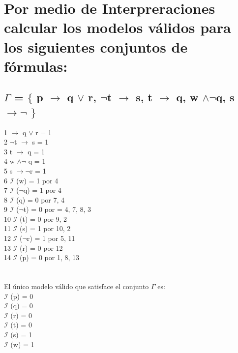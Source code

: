 \documentclass[11pt,letterpaper]{article}
\begin{document}
  \section{Por medio de Interpreraciones calcular los modelos válidos para los siguientes conjuntos de fórmulas:}
    \subsection{$\Gamma$ = $\{$ p $\rightarrow$ q $\vee$ r, $\neg$t $\rightarrow$ s, t $\rightarrow$ q, w $\wedge \neg$q, s $\rightarrow \neg$ $\}$ }
      \begin{multicols}{2}
        1 $\rightarrow$ q $\vee$ r = 1 \\
        2 $\neg$t $\rightarrow$ s = 1 \\
        3 t $\rightarrow$ q = 1 \\
        4 w $\wedge \neg$ q = 1 \\
        5 s $\rightarrow \neg$r = 1 \\
        6 $\mathcal{I}$ (w) = 1  \qquad por 4\\
        7 $\mathcal{I}$ ($\neg$q) = 1  \qquad por 4\\
        8 $\mathcal{I}$ (q) = 0   \qquad por 7, 4\\
        9 $\mathcal{I}$ ($\neg$t) = 0  \qquad por = 4, 7, 8, 3 \\
        10 $\mathcal{I}$ (t) = 0  \qquad por 9, 2\\
        11 $\mathcal{I}$ (s) = 1  \qquad por 10, 2\\
        12 $\mathcal{I}$ ($\neg$r) = 1  \quad por 5, 11\\
        13 $\mathcal{I}$ (r) = 0  \qquad por 12\\
        14 $\mathcal{I}$ (p) = 0 \qquad  por 1, 8,  13\\ \\ \\
        El único modelo válido que satisface el conjunto $\Gamma$ es: \\
        $\mathcal{I}$ (p) = 0 \\
        $\mathcal{I}$ (q) = 0\\
        $\mathcal{I}$ (r) = 0\\
        $\mathcal{I}$ (t) = 0\\
        $\mathcal{I}$ (s) = 1\\
        $\mathcal{I}$ (w) = 1\\ \\ \\ \\
      \end{multicols}
\end{document}
